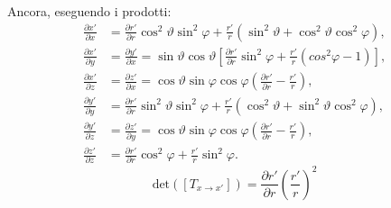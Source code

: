 Ancora, eseguendo i prodotti:
\begin{align}
\label{eq:4composizione5}
\frac{\partial x'}{\partial x} &= \frac{\partial r'}{\partial r}\cos^2 \vartheta\sin^2\varphi+\frac{r'}{r}\left(\sin^2\vartheta+\cos^2 \vartheta\cos^2\varphi\right),\nonumber\\
\frac{\partial x'}{\partial y} &= \frac{\partial y'}{\partial x} =
\sin\vartheta\cos\vartheta\left[\frac{\partial r'}{\partial r}\sin^2\varphi+\frac{r'}{r}\left(cos^2\varphi-1\right)\right] 
,\nonumber\\
\frac{\partial x'}{\partial z}&=\frac{\partial z'}{\partial x}=\cos\vartheta \sin\varphi\cos\varphi\left(\frac{\partial r'}{\partial r}-\frac{r'}{r}\right),\nonumber\\
\frac{\partial y'}{\partial y}&=\frac{\partial r'}{\partial r}\sin^2 \vartheta\sin^2\varphi+\frac{r'}{r}\left(\cos^2\vartheta+\sin^2 \vartheta\cos^2\varphi\right),\nonumber\\
\frac{\partial y'}{\partial z} &= \frac{\partial z'}{\partial y} = \cos\vartheta \sin\varphi\cos\varphi\left(\frac{\partial r'}{\partial r}-\frac{r'}{r}\right),\nonumber\\
\frac{\partial z'}{\partial z} &= \frac{\partial r'}{\partial r}\cos^2\varphi+\frac{r'}{r}\sin^2\varphi.\nonumber
\end{align}
\begin{equation}
\label{eq:4det2d_bis}
\text{det}\left(\left[T_{x\rightarrow x'}\right]\right)=\frac{\partial r'}{\partial r}\left(\frac{r'}{r}\right)^2
\end{equation}

